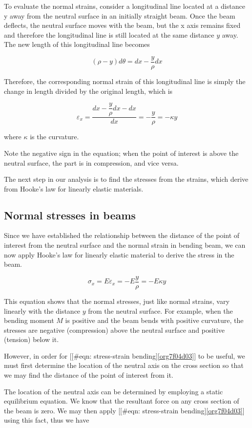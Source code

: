 \documentclass[a4paper,openany,12pt]{book}
\begin{document}
To evaluate the normal strains, consider a longitudinal line located at
a distance y away from the neutral surface in an initially straight
beam. Once the beam deflects, the neutral surface moves with the beam,
but the x axis remains fixed and therefore the longitudinal line is
still located at the same distance \(y\) away. The new length of this
longitudinal line becomes

$$(\rho  - y)d\theta  = dx - \dfrac{y}{\rho }dx$$

Therefore, the corresponding normal strain of this longitudinal line is
simply the change in length divided by the original length, which is

$$\varepsilon _x = \frac{dx - \dfrac{y}{\rho }dx - dx}{dx} =  - \dfrac{y}{\rho } =  - \kappa y$$

where \(\kappa\) is the curvature.

Note the negative sign in the equation; when the point of interest is
above the neutral surface, the part is in compression, and vice versa.

The next step in our analysis is to find the stresses from the strains,
which derive from Hooke's law for linearly elastic materials.

\subsection{Normal stresses in beams}
\label{sec:orgb5776c1}
Since we have established the relationship between the distance of the
point of interest from the neutral surface and the normal strain in
bending beam, we can now apply Hooke's law for linearly elastic material
to derive the stress in the beam.

$$\sigma_x = E\varepsilon_x =  - E\frac{y}{\rho } =  - E\kappa y$$

This equation shows that the normal stresses, just like normal strains,
vary linearly with the distance \(y\) from the neutral surface. For
example, when the bending moment \(M\) is positive and the beam bends with
positive curvature, the stresses are negative (compression) above the
neutral surface and positive (tension) below it.

However, in order for
[[\#eqn: stress-strain bending]\ref{org7f04d03}] to be
useful, we must first determine the location of the neutral axis on the
cross section so that we may find the distance of the point of interest
from it.

The location of the neutral axis can be determined by employing a static
equilibrium equation. We know that the resultant force on any cross
section of the beam is zero. We may then apply
[[\#eqn: stress-strain bending]\ref{org7f04d03}] using this
fact, thus we have
\end{document}
